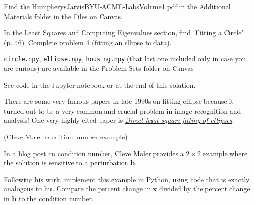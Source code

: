 \documentclass[12pt,letterpaper,answers]{exam}
\newcommand{\vc}[1]{\boldsymbol{#1}}
\begin{document}
\begin{questions}
\question Find the HumpherysJarvisBYU-ACME-LabsVolume1.pdf in the Additional Materials folder in the Files on Canvas.

In the Least Squares and Computing Eigenvalues section, find `Fitting a Circle' (p. 46).  Complete problem 4 (fitting an ellipse to data).

\texttt{circle.npy}, \texttt{ellipse.npy}, \texttt{housing.npy} (that last one included only in case you are curious) are available in the Problem Sets folder on Canvas

\begin{solution}
    See code in the Jupyter notebook or at the end of this solution.

    There are some very famous papers in late 1990s on fitting ellipse because it turned out to be a very common and crucial problem in image recognition and analysis! One very highly cited paper is \href{https://ieeexplore.ieee.org/document/765658}{\textit{Direct least square fitting of ellipses}}.
\end{solution}








\question (Cleve Moler condition number example)

In a \href{https://blogs.mathworks.com/cleve/2017/07/17/what-is-the-condition-number-of-a-matrix/}{blog post} on condition number, \href{https://en.wikipedia.org/wiki/Cleve_Moler}{Cleve Moler} provides a $2\times 2$ example where the solution is sensitive to a perturbation $\vc{b}$.

\begin{parts}
\item Following his work, implement this example in Python, using code that is exactly analogous to his.  Compare the percent change in $\vc{x}$ divided by the percent change in $\vc{b}$ to the condition number.


\end{parts}
\end{questions}
\end{document}
